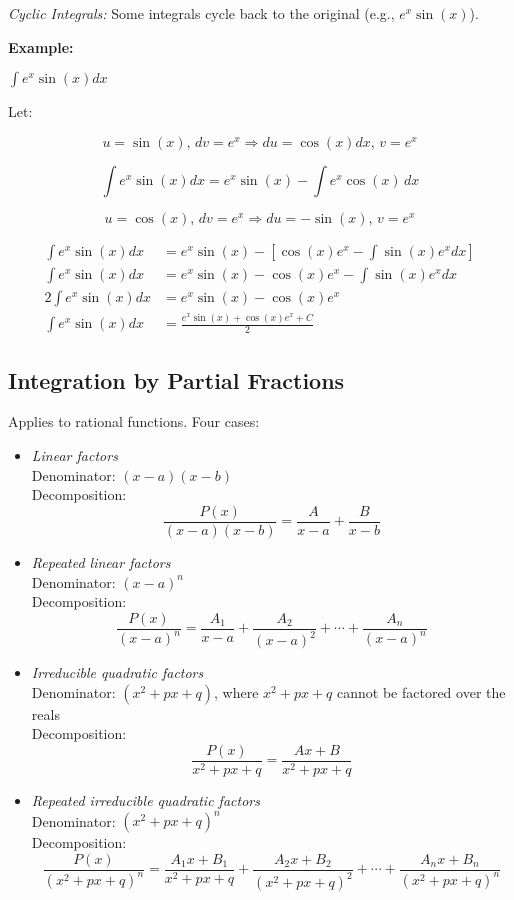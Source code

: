 \emph{Cyclic Integrals:} Some integrals cycle back to the original (e.g., \(e^x \sin(x)\)).

\textbf{Example:}

\(\int e^x \sin(x)dx\)

Let:

\[
    u = \sin (x), \, dv = e^x \Rightarrow du = \cos (x)dx, \, v = e^x
\]

\[
    \int e^x \sin(x)dx = e^x \sin (x) - \int e^x \cos(x)\,dx 
\]

\[
    u = \cos(x), \, dv = e^x \Rightarrow du = -\sin(x), \, v = e^x
\]

\begin{align*}
    \int e^x \sin(x)dx &= e^x \sin (x) - \left[\cos(x)e^x - \int \sin(x)e^x dx \right] \\
    \int e^x \sin(x)dx &= e^x \sin (x) - \cos(x)e^x - \int \sin(x)e^x dx \\
    2\int e^x \sin(x)dx &= e^x \sin (x) - \cos(x)e^x \\
    \int e^x \sin(x)dx &= \frac{e^x \sin (x) +\cos(x)e^x + C}{2}
\end{align*}

\subsection{Integration by Partial Fractions}

Applies to rational functions. Four cases:

\begin{itemize}

    \item \emph{Linear factors} \\
    Denominator: \((x - a)(x - b)\) \\
    Decomposition: 
    \[
        \frac{P(x)}{(x - a)(x - b)} = \frac{A}{x - a} + \frac{B}{x - b}
    \]

    \item \emph{Repeated linear factors} \\
    Denominator: \((x - a)^n\) \\
    Decomposition: 
    \[
        \frac{P(x)}{(x - a)^n} = \frac{A_1}{x - a} + \frac{A_2}{(x - a)^2} + \cdots + \frac{A_n}{(x - a)^n}
    \]

    \item \emph{Irreducible quadratic factors} \\
    Denominator: \((x^2 + px + q)\), where \(x^2 + px + q\) cannot be factored over the reals \\
    Decomposition:
    \[
        \frac{P(x)}{x^2 + px + q} = \frac{Ax + B}{x^2 + px + q}
    \]

    \item \emph{Repeated irreducible quadratic factors} \\
    Denominator: \((x^2 + px + q)^n\) \\
    Decomposition:
    \[
        \frac{P(x)}{(x^2 + px + q)^n} = \frac{A_1x + B_1}{x^2 + px + q} + \frac{A_2x + B_2}{(x^2 + px + q)^2} + \cdots + \frac{A_nx + B_n}{(x^2 + px + q)^n}
    \]

\end{itemize}

